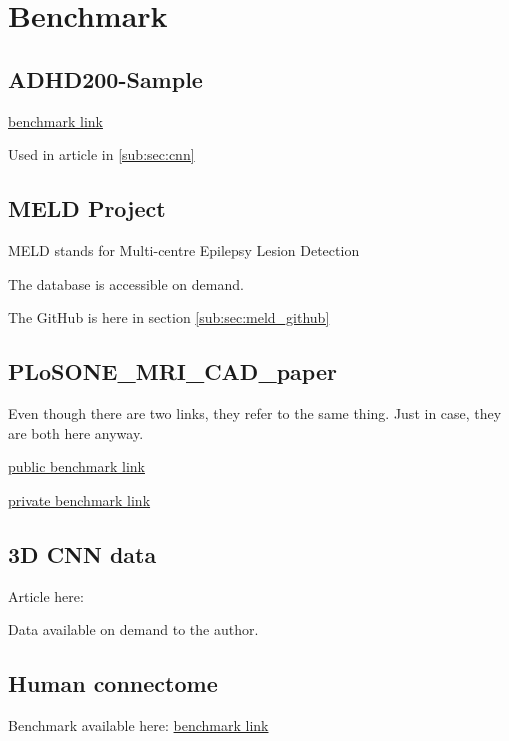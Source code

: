 \chapter{Benchmark}

\section{ADHD200-Sample}

\href{https://fcon_1000.projects.nitrc.org/indi/adhd200/}{benchmark link}

Used in article in \ref{sub:sec:cnn}

\section{MELD Project}

MELD stands for Multi-centre Epilepsy Lesion Detection

The database is accessible on demand.

The GitHub is here in section \ref{sub:sec:meld_github}

\section{PLoSONE\_MRI\_CAD\_paper}

Even though there are two links, they refer to the same thing. Just in case, they are both here anyway.

\href{https://figshare.com/articles/journal_contribution/PLoSONE_MRI_CAD_paper/3573471?file=5653479}{public benchmark link}

\href{https://figshare.com/s/70178bc154bd83258322?file=5653479}{private benchmark link}

\section{3D CNN data}

Article here: 

Data available on demand to the author.

\section{Human connectome}

Benchmark available here: \href{https://www.humanconnectome.org/study/hcp-young-adult}{benchmark link}
